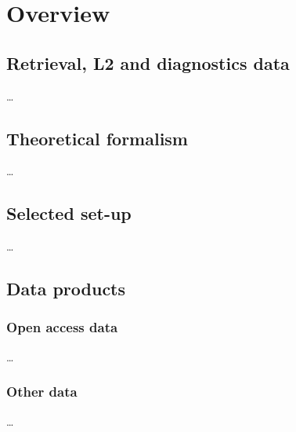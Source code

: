 \chapter{Overview}
\label{chapter:overview}


\section{Retrieval, L2 and diagnostics data}
\label{sec:l2}
%
\dots


\section{Theoretical formalism}
\label{sec:formalism}
%
\dots


\section{Selected set-up}
\label{sec:setup}
%
\dots


\section{Data products}
\label{sec:products}


\subsection{Open access data}
\label{sec:opendata}
%
\dots


\subsection{Other data}
\label{sec:otherdata}
%
\dots




